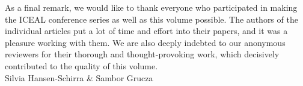 \documentclass[output=paper]{langsci/langscibook}
\begin{document}
As a final remark, we would like to thank everyone who participated in making the ICEAL conference series as well as this volume possible. The authors of the individual articles put a lot of time and effort into their papers, and it was a pleasure working with them. We are also deeply indebted to our anonymous reviewers for their thorough and thought-provoking work, which decisively contributed to the quality of this volume.\\

\noindent Silvia Hansen-Schirra \& Sambor Grucza




{\sloppy
\printbibliography[heading=subbibliography,notkeyword=this]
}
\end{document}
